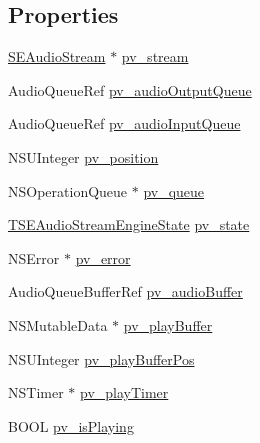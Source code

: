 \subsection*{Properties}
\begin{DoxyCompactItemize}
\item 
\hyperlink{interface_s_e_audio_stream}{S\-E\-Audio\-Stream} $\ast$ \hyperlink{category_s_e_audio_stream_engine_07_08_ab9879d1cd039675a837837ccd094b956}{pv\-\_\-stream}
\item 
Audio\-Queue\-Ref \hyperlink{category_s_e_audio_stream_engine_07_08_aeba6c4680df8f38ea1271cfc52e697c5}{pv\-\_\-audio\-Output\-Queue}
\item 
Audio\-Queue\-Ref \hyperlink{category_s_e_audio_stream_engine_07_08_a4baace9b0ac0bccb1ab2e87446fb76be}{pv\-\_\-audio\-Input\-Queue}
\item 
N\-S\-U\-Integer \hyperlink{category_s_e_audio_stream_engine_07_08_a3248ba3a7ac29c4f865d24d084388ed0}{pv\-\_\-position}
\item 
N\-S\-Operation\-Queue $\ast$ \hyperlink{category_s_e_audio_stream_engine_07_08_adbcd5ee6428568c23a4a70a0387fe6bc}{pv\-\_\-queue}
\item 
\hyperlink{_s_e_audio_stream_engine_8h_a6eabe41a5616eddfad154f7259ccdc27}{T\-S\-E\-Audio\-Stream\-Engine\-State} \hyperlink{category_s_e_audio_stream_engine_07_08_a9f97a9d34b849921ab25f63422b4b02f}{pv\-\_\-state}
\item 
N\-S\-Error $\ast$ \hyperlink{category_s_e_audio_stream_engine_07_08_a553f6f36c7c69e5bcd7a63479b85c523}{pv\-\_\-error}
\item 
Audio\-Queue\-Buffer\-Ref \hyperlink{category_s_e_audio_stream_engine_07_08_ac0bed6a9ad4abf1fbaafc01fe2440283}{pv\-\_\-audio\-Buffer}
\item 
N\-S\-Mutable\-Data $\ast$ \hyperlink{category_s_e_audio_stream_engine_07_08_a358e58a2d9db7fd33050b6d3e3c00868}{pv\-\_\-play\-Buffer}
\item 
N\-S\-U\-Integer \hyperlink{category_s_e_audio_stream_engine_07_08_a357f65ae666f5971174ec6a162d76afd}{pv\-\_\-play\-Buffer\-Pos}
\item 
N\-S\-Timer $\ast$ \hyperlink{category_s_e_audio_stream_engine_07_08_aacc4ea3a3cebb5f53f99f8539e96b233}{pv\-\_\-play\-Timer}
\item 
B\-O\-O\-L \hyperlink{category_s_e_audio_stream_engine_07_08_a83ad29af81c705aa2f0f8474540f415e}{pv\-\_\-is\-Playing}
\end{DoxyCompactItemize}


